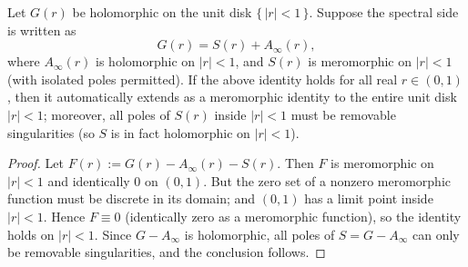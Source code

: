 \begin{proposition}\label{prop:real-arc-sufficiency-unit-disk}
Let \(G(r)\) be holomorphic on the unit disk \(\{\,|r|<1\,\}\).
Suppose the spectral side is written as
\[
G(r)=S(r)+A_\infty(r),
\]
where \(A_\infty(r)\) is holomorphic on \(|r|<1\), and \(S(r)\) is meromorphic on \(|r|<1\) (with isolated poles permitted).
If the above identity holds for all real \(r\in(0,1)\), then it automatically extends as a meromorphic identity to the entire unit disk \(|r|<1\);
moreover, all poles of \(S(r)\) inside \(|r|<1\) must be removable singularities (so \(S\) is in fact holomorphic on \(|r|<1\)).
\end{proposition}
\begin{proof}
Let \(F(r):=G(r)-A_\infty(r)-S(r)\). Then \(F\) is meromorphic on \(|r|<1\) and identically \(0\) on \((0,1)\).
But the zero set of a nonzero meromorphic function must be discrete in its domain; and \((0,1)\) has a limit point inside \(|r|<1\).
Hence \(F\equiv 0\) (identically zero as a meromorphic function), so the identity holds on \(|r|<1\).
Since \(G-A_\infty\) is holomorphic, all poles of \(S=G-A_\infty\) can only be removable singularities, and the conclusion follows.
\end{proof}

